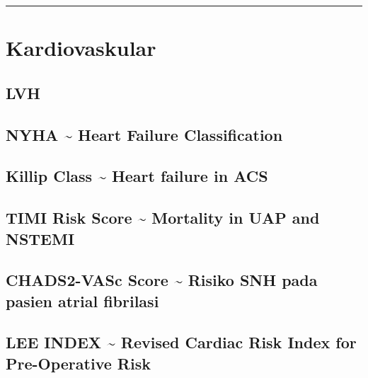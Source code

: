 \documentclass[
]{book}
\begin{document}
\begin{center}\rule{0.5\linewidth}{0.5pt}\end{center}

\hypertarget{kardiovaskular}{%
\section{Kardiovaskular}\label{kardiovaskular}}

\hypertarget{lvh}{%
\subsection{LVH}\label{lvh}}

\hypertarget{nyha-heart-failure-classification}{%
\subsection{NYHA \textasciitilde{} Heart Failure Classification}\label{nyha-heart-failure-classification}}

\hypertarget{killip-class-heart-failure-in-acs}{%
\subsection{Killip Class \textasciitilde{} Heart failure in ACS}\label{killip-class-heart-failure-in-acs}}

\hypertarget{timi-risk-score-mortality-in-uap-and-nstemi}{%
\subsection{TIMI Risk Score \textasciitilde{} Mortality in UAP and NSTEMI}\label{timi-risk-score-mortality-in-uap-and-nstemi}}

\hypertarget{chads2-vasc-score-risiko-snh-pada-pasien-atrial-fibrilasi}{%
\subsection{CHADS2-VASc Score \textasciitilde{} Risiko SNH pada pasien atrial fibrilasi}\label{chads2-vasc-score-risiko-snh-pada-pasien-atrial-fibrilasi}}

\hypertarget{lee-index-revised-cardiac-risk-index-for-pre-operative-risk}{%
\subsection{LEE INDEX \textasciitilde{} Revised Cardiac Risk Index for Pre-Operative Risk}\label{lee-index-revised-cardiac-risk-index-for-pre-operative-risk}}
\end{document}
